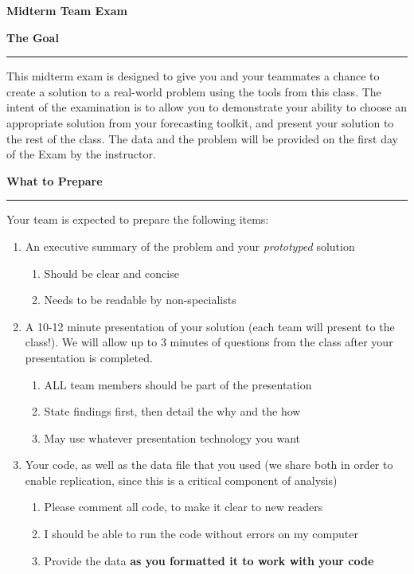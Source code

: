\documentclass{article}
\begin{document}
\pagestyle{empty}

\begin{center} \Huge \textbf{Midterm Team Exam} \end{center}
\vspace*{1em}

\noindent \Large \textbf{The Goal}\\[-.8em]\hrule \vspace*{.5em}

\large \noindent This midterm exam is designed to give you and your teammates a chance to create a solution to a real-world problem using the tools from this class. The intent of the examination is to allow you to demonstrate your ability to choose an appropriate solution from your forecasting toolkit, and present your solution to the rest of the class. The data and the problem will be provided on the first day of the Exam by the instructor.

\vspace*{2em}
\noindent \Large \textbf{What to Prepare}\\[-.8em]\hrule \vspace*{.5em}
\large \noindent Your team is expected to prepare the following items:
\begin{enumerate}
\item An executive summary of the problem and your \emph{prototyped} solution
\begin{enumerate}
\item Should be clear and concise
\item Needs to be readable by non-specialists
\end{enumerate}
\item A 10-12 minute presentation of your solution (each team will present to the class!). We will allow up to 3 minutes of questions from the class after your presentation is completed.
\begin{enumerate}
\item ALL team members should be part of the presentation
\item State findings first, then detail the why and the how
\item May use whatever presentation technology you want
\end{enumerate}
\item Your code, as well as the data file that you used (we share both in order to enable replication, since this is a critical component of analysis)
\begin{enumerate}
\item Please comment all code, to make it clear to new readers
\item I should be able to run the code without errors on my computer
\item Provide the data \textbf{as you formatted it to work with your code}
\end{enumerate}
\end{enumerate}
\end{document}
